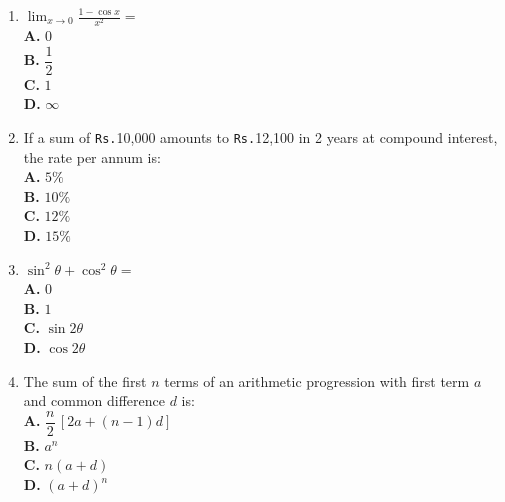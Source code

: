 \documentclass[11pt]{article}
\newcommand{\rupee}{\texttt{Rs.}}
\begin{document}
\begin{enumerate}[label=Q\arabic*., leftmargin=*]
\item $\displaystyle \lim_{x\to 0} \frac{1 - \cos x}{x^2} =$ 
\\[0.5em]
\textbf{A.} $0$\\
\textbf{B.} $\dfrac{1}{2}$\\
\textbf{C.} $1$\\
\textbf{D.} $\infty$

\item If a sum of \rupee{}10{,}000 amounts to \rupee{}12{,}100 in 2 years at compound interest, the rate per annum is:
\\[0.5em]
\textbf{A.} $5\%$\\
\textbf{B.} $10\%$\\
\textbf{C.} $12\%$\\
\textbf{D.} $15\%$

\item $\sin^2\theta + \cos^2\theta =$ 
\\[0.5em]
\textbf{A.} $0$\\
\textbf{B.} $1$\\
\textbf{C.} $\sin 2\theta$\\
\textbf{D.} $\cos 2\theta$

\item The sum of the first $n$ terms of an arithmetic progression with first term $a$ and common difference $d$ is:
\\[0.5em]
\textbf{A.} $\dfrac{n}{2}\,[2a + (n-1)d]$\\
\textbf{B.} $a^{n}$\\
\textbf{C.} $n(a+d)$\\
\textbf{D.} $(a+d)^{n}$
\end{enumerate}
\end{document}
